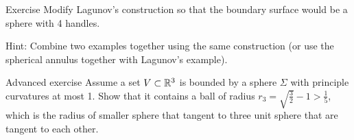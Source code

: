 \begin{thm}{Exercise}
Modify Lagunov's construction so that the boundary surface would be a sphere with 4 handles.
\end{thm}

Hint: Combine two examples together using the same construction (or use the spherical annulus together with Lagunov's example).


\begin{thm}{Advanced exercise}
Assume a set $V\subset \mathbb{R}^3$ is bounded by a sphere $\Sigma$ with principle curvatures at most 1.
Show that it contains a ball of radius $r_3=\sqrt{\tfrac32}-1>\tfrac15$,
which is the radius of smaller sphere that tangent to three unit sphere that are tangent to each other.
\end{thm}






